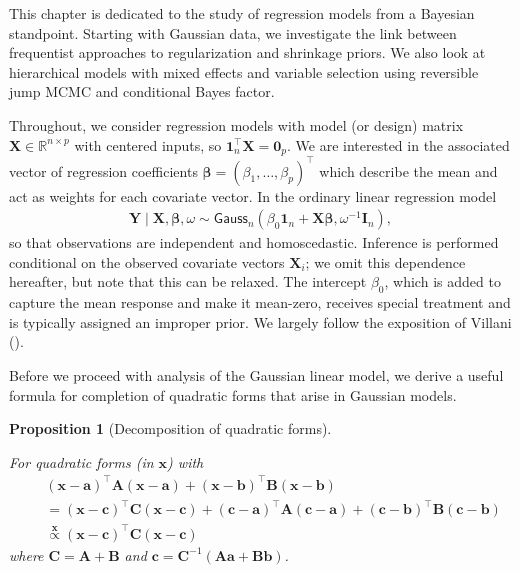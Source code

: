 \documentclass[
  11pt,
  letterpaper,
]{scrbook}
\theoremstyle{definition}
\theoremstyle{definition}
\theoremstyle{definition}
\theoremstyle{plain}
\newtheorem{proposition}{Proposition}[chapter]
\theoremstyle{plain}
\theoremstyle{plain}
\theoremstyle{remark}
\begin{document}
This chapter is dedicated to the study of regression models from a
Bayesian standpoint. Starting with Gaussian data, we investigate the
link between frequentist approaches to regularization and shrinkage
priors. We also look at hierarchical models with mixed effects and
variable selection using reversible jump MCMC and conditional Bayes
factor.

Throughout, we consider regression models with model (or design) matrix
\(\mathbf{X} \in \mathbb{R}^{n \times p}\) with centered inputs, so
\(\mathbf{1}_n^\top\mathbf{X}=\mathbf{0}_p.\) We are interested in the
associated vector of regression coefficients
\(\boldsymbol{\beta} = (\beta_1, \ldots, \beta_p)^\top\) which describe
the mean and act as weights for each covariate vector. In the ordinary
linear regression model \begin{align*}
\boldsymbol{Y} \mid \mathbf{X}, \boldsymbol{\beta}, \omega \sim \mathsf{Gauss}_n(\beta_0\mathbf{1}_n + \mathbf{X}\boldsymbol{\beta}, \omega^{-1}\mathbf{I}_n),
\end{align*} so that observations are independent and homoscedastic.
Inference is performed conditional on the observed covariate vectors
\(\mathbf{X}_i\); we omit this dependence hereafter, but note that this
can be relaxed. The intercept \(\beta_0\), which is added to capture the
mean response and make it mean-zero, receives special treatment and is
typically assigned an improper prior. We largely follow the exposition
of Villani ().

Before we proceed with analysis of the Gaussian linear model, we derive
a useful formula for completion of quadratic forms that arise in
Gaussian models.

\begin{proposition}[Decomposition of quadratic
forms]\protect\hypertarget{prp-quadratic-forms}{}\label{prp-quadratic-forms}

For quadratic forms (in \(\boldsymbol{x}\)) with \begin{align*}
& (\boldsymbol{x} - \boldsymbol{a})^\top \mathbf{A}(\boldsymbol{x} - \boldsymbol{a}) + (\boldsymbol{x} - \boldsymbol{b})^\top \mathbf{B}(\boldsymbol{x} - \boldsymbol{b}) \\\quad &=
 (\boldsymbol{x} - \boldsymbol{c})^\top \mathbf{C}(\boldsymbol{x} - \boldsymbol{c}) + (\boldsymbol{c}-\boldsymbol{a})^\top\mathbf{A}(\boldsymbol{c}-\boldsymbol{a}) + (\boldsymbol{c}-\boldsymbol{b})^\top\mathbf{B}(\boldsymbol{c}-\boldsymbol{b})\\
&\stackrel{\boldsymbol{x}}{\propto} (\boldsymbol{x} - \boldsymbol{c})^\top \mathbf{C}(\boldsymbol{x} - \boldsymbol{c})
\end{align*} where \(\mathbf{C} = \mathbf{A} + \mathbf{B}\) and
\(\boldsymbol{c}= \mathbf{C}^{-1}(\mathbf{A}\boldsymbol{a} + \mathbf{B}\boldsymbol{b})\).

\end{proposition}
\end{document}
